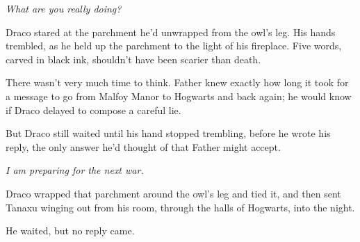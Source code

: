 \emph{What are you really doing?}

Draco stared at the parchment he'd unwrapped from the owl's leg. His hands trembled, as he held up the parchment to the light of his fireplace. Five words, carved in black ink, shouldn't have been scarier than death.

There wasn't very much time to think. Father knew exactly how long it took for a message to go from Malfoy Manor to Hogwarts and back again; he would know if Draco delayed to compose a careful lie.

But Draco still waited until his hand stopped trembling, before he wrote his reply, the only answer he'd thought of that Father might accept.

\emph{I am preparing for the next war.}

Draco wrapped that parchment around the owl's leg and tied it, and then sent Tanaxu winging out from his room, through the halls of Hogwarts, into the night.

He waited, but no reply came.

